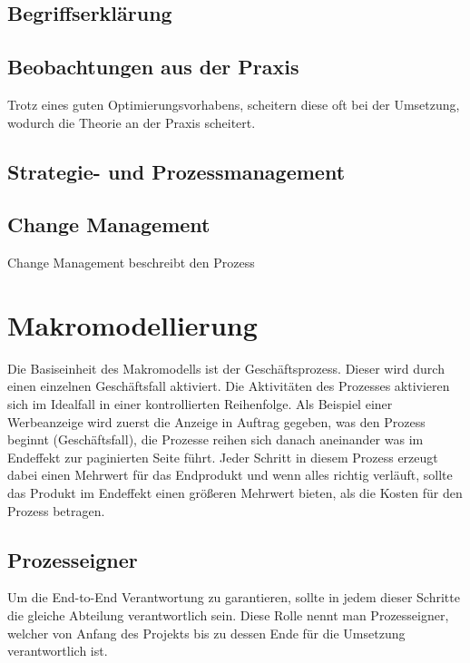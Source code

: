 \documentclass{article}
\begin{document}
  \subsection{Begriffserklärung}
  \subsection{Beobachtungen aus der Praxis}
  Trotz eines guten Optimierungsvorhabens, scheitern diese oft bei der Umsetzung, wodurch die Theorie an der Praxis scheitert.
  \subsection{Strategie- und Prozessmanagement}
  \subsection{Change Management}
  Change Management beschreibt den Prozess
  \section{Makromodellierung}
  Die Basiseinheit des Makromodells ist der Geschäftsprozess. Dieser wird durch einen einzelnen Geschäftsfall aktiviert. Die Aktivitäten des Prozesses aktivieren sich im Idealfall in einer kontrollierten Reihenfolge. Als Beispiel einer Werbeanzeige wird zuerst die Anzeige in Auftrag gegeben, was den Prozess beginnt (Geschäftsfall), die Prozesse reihen sich danach aneinander was im Endeffekt zur paginierten Seite führt. Jeder Schritt in diesem Prozess erzeugt dabei einen Mehrwert für das Endprodukt und wenn alles richtig verläuft, sollte das Produkt im Endeffekt einen größeren Mehrwert bieten, als die Kosten für den Prozess betragen. 
  \subsection{Prozesseigner}
  Um die End-to-End Verantwortung zu garantieren, sollte in jedem dieser Schritte die gleiche Abteilung verantwortlich sein. Diese Rolle nennt man Prozesseigner, welcher von Anfang des Projekts bis zu dessen Ende für die Umsetzung verantwortlich ist.
\end{document}
